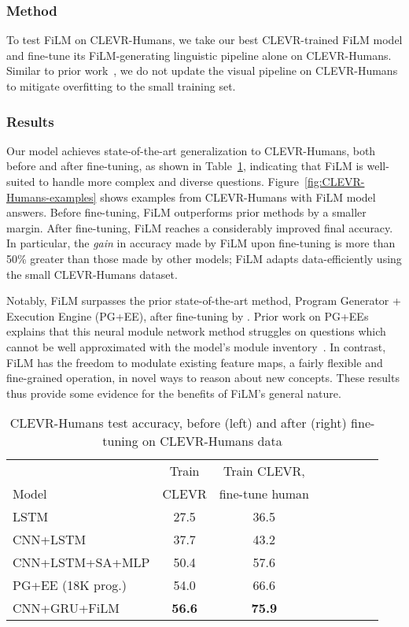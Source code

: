 \documentclass[letterpaper]{article} \usepackage{aaai18}  \usepackage{times}  \usepackage{helvet}  \usepackage{courier}  \usepackage{url}  \usepackage{graphicx}  \frenchspacing  \setlength{\pdfpagewidth}{8.5in}  \setlength{\pdfpageheight}{11in}
\begin{document}
        \subsubsection{Method}
		To test FiLM on CLEVR-Humans, we take our best CLEVR-trained FiLM model and fine-tune its FiLM-generating linguistic pipeline alone on CLEVR-Humans. Similar to prior work~\cite{IEP}, we do not update the visual pipeline on CLEVR-Humans to mitigate overfitting to the small training set.
        
        \subsubsection{Results}
		Our model achieves state-of-the-art generalization to CLEVR-Humans, both before and after fine-tuning, as shown in Table~\ref{tab:CLEVR-Humans}, indicating that FiLM is well-suited to handle more complex and diverse questions. Figure~\ref{fig:CLEVR-Humans-examples} shows examples from CLEVR-Humans with FiLM model answers. Before fine-tuning, FiLM outperforms prior methods by a smaller margin. After fine-tuning, FiLM reaches a considerably improved final accuracy. In particular, the \textit{gain} in accuracy made by FiLM upon fine-tuning is more than 50\% greater than those made by other models; FiLM adapts data-efficiently using the small CLEVR-Humans dataset.
        
        Notably, FiLM surpasses the prior state-of-the-art method, Program Generator + Execution Engine (PG+EE), after fine-tuning by \textit{}. Prior work on PG+EEs explains that this neural module network method struggles on questions which cannot be well approximated with the model's module inventory~\cite{IEP}. In contrast, FiLM has the freedom to modulate existing feature maps, a fairly flexible and fine-grained operation, in novel ways to reason about new concepts. These results thus provide some evidence for the benefits of FiLM's general nature.

    	\begin{table}[t]
          \centering
          {\small
          \begin{tabular}{l|c|cccccc}
          \toprule
          {}      & {Train} & {Train CLEVR,} \\
          {Model} & {CLEVR} & {fine-tune human} \\
          \midrule
          LSTM               & 27.5 & 36.5 \\
          CNN+LSTM           & 37.7 & 43.2 \\
          CNN+LSTM+SA+MLP    & 50.4 & 57.6 \\
          PG+EE (18K prog.)  & 54.0 & 66.6 \\
          \midrule
          CNN+GRU+FiLM & \textbf{56.6} & \textbf{75.9} \\
          \bottomrule
          \end{tabular}
          }
          \caption{\label{tab:CLEVR-Humans} CLEVR-Humans test accuracy, before (left) and after (right) fine-tuning on CLEVR-Humans data}
        \end{table}
    
\end{document}
